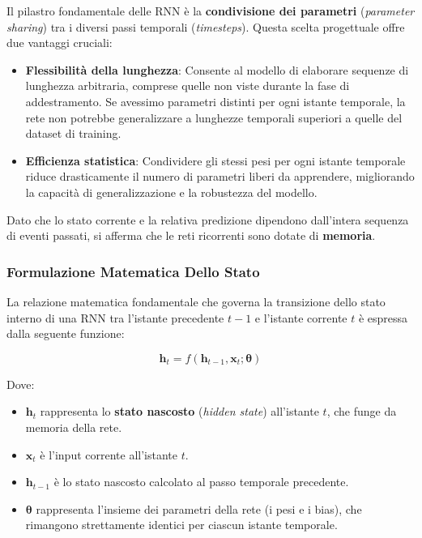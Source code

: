 ﻿\documentclass[11pt, a4paper]{article}
\begin{document}
Il pilastro fondamentale delle RNN è la \textbf{condivisione dei parametri} (\emph{parameter sharing}) tra i diversi passi temporali (\emph{timesteps}). Questa scelta progettuale offre due vantaggi cruciali:
\begin{itemize}
    \item \textbf{Flessibilità della lunghezza}: Consente al modello di elaborare sequenze di lunghezza arbitraria, comprese quelle non viste durante la fase di addestramento. Se avessimo parametri distinti per ogni istante temporale, la rete non potrebbe generalizzare a lunghezze temporali superiori a quelle del dataset di training.
    \item \textbf{Efficienza statistica}: Condividere gli stessi pesi per ogni istante temporale riduce drasticamente il numero di parametri liberi da apprendere, migliorando la capacità di generalizzazione e la robustezza del modello.
\end{itemize}

Dato che lo stato corrente e la relativa predizione dipendono dall'intera sequenza di eventi passati, si afferma che le reti ricorrenti sono dotate di \textbf{memoria}.

\newpage

\subsubsection{Formulazione Matematica Dello Stato}

La relazione matematica fondamentale che governa la transizione dello stato interno di una RNN tra l'istante precedente $t-1$ e l'istante corrente $t$ è espressa dalla seguente funzione:

\[
\boxed{\bm{h}_t = f(\bm{h}_{t-1}, \bm{x}_t; \bm{\theta})}
\]

Dove:
\begin{itemize}[noitemsep]
    \item $\bm{h}_t$ rappresenta lo \textbf{stato nascosto} (\emph{hidden state}) all'istante $t$, che funge da memoria della rete.
    \item $\bm{x}_t$ è l'input corrente all'istante $t$.
    \item $\bm{h}_{t-1}$ è lo stato nascosto calcolato al passo temporale precedente.
    \item $\bm{\theta}$ rappresenta l'insieme dei parametri della rete (i pesi e i bias), che rimangono strettamente identici per ciascun istante temporale.
\end{itemize}
\end{document}
